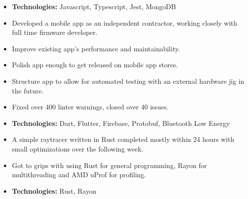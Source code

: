 \documentclass[10pt,a4paper,ragged2e,academicons]{altacv}
\begin{document}


\makecvheader{}
\begin{paracol}{2}

  \begin{itemize}
    \item \textbf{Technologies:} Javascript, Typescript, Jest, MongoDB
  \end{itemize}
  

  \begin{itemize}
    \item Developed a mobile app as an independent contractor, working closely with full time firmware developer.
    \item Improve existing app's performance and maintainability.
    \item Polish app enough to get released on mobile app stores.
    \item Structure app to allow for automated testing with an external hardware jig in the future.
    \item Fixed over 400 linter warnings, closed over 40 issues.
    \item \textbf{Technologies:} Dart, Flutter, Firebase, Protobuf, Bluetooth Low Energy
  \end{itemize}
  \divider\small

  \begin{itemize}
    \item A simple raytracer written in Rust completed mostly within 24 hours with small optimizations over the following week.
    \item Got to grips with using Rust for general programming, Rayon for multithreading and AMD uProf for profiling.
    \item \textbf{Technologies:} Rust, Rayon
  \end{itemize}
  \divider\small


\end{paracol}
\end{document}
